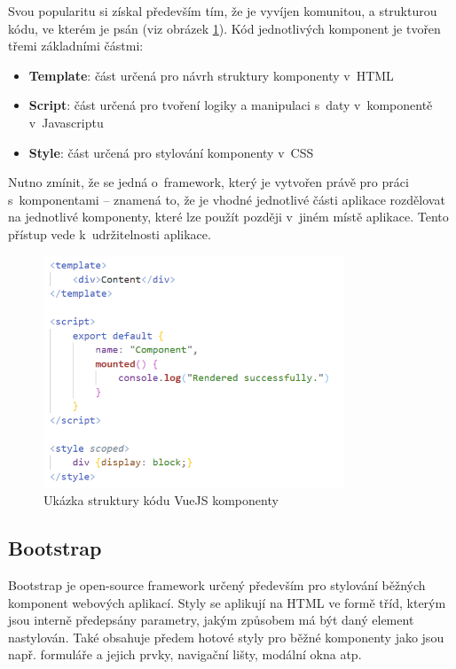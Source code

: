 	Svou popularitu si získal především tím, že je vyvíjen komunitou, a strukturou kódu, ve kterém je psán (viz obrázek \ref{fig:vue_kod_komponenty}). Kód jednotlivých komponent je tvořen třemi základními částmi:
	
	\begin{itemize}
		\item \textbf{Template}: část určená pro návrh struktury komponenty v~HTML
		\item \textbf{Script}: část určená pro tvoření logiky a manipulaci s~daty v~komponentě v~Javascriptu
		\item \textbf{Style}: část určená pro stylování komponenty v~CSS
	\end{itemize}

	Nutno zmínit, že se jedná o~framework, který je vytvořen právě pro práci s~komponentami – znamená to, že je vhodné jednotlivé části aplikace rozdělovat na jednotlivé komponenty, které lze použít později v~jiném místě aplikace. Tento přístup vede k~udržitelnosti aplikace. \cite{VueJSSyntax}\cite{VueJS2}
	
	\begin{figure}[h]
		\centering
		\includegraphics[width=0.8\textwidth]{img/vue_kod_komponenty.png}
		\caption{Ukázka struktury kódu VueJS komponenty}
		\label{fig:vue_kod_komponenty}
	\end{figure}
	
	\subsection{Bootstrap}
	Bootstrap je open-source framework určený především pro stylování běžných komponent webových aplikací. Styly se aplikují na HTML ve formě tříd, kterým jsou interně předepsány parametry, jakým způsobem má být daný element nastylován. Také obsahuje předem hotové styly pro běžné komponenty jako jsou např. formuláře a jejich prvky, navigační lišty, modální okna atp. \cite{Bootstrap1}\cite{Bootstrap2}\cite{Bootstrap3}
	
